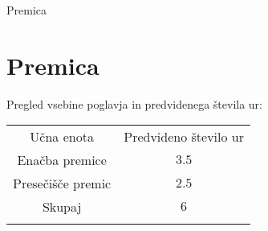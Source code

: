 \begin{priprava}{0}{}{}{Premica}{}{}
    
    \chapter{Premica}

    \Large{Pregled vsebine poglavja in predvidenega števila ur:}

    \begin{table}[H]
        \centering
        \begin{tabular}{||c|c||} 
        \hhline{|t:==:t|}
        \rowcolor[rgb]{0.843,0.718,0.718} 
        Učna enota  & Predvideno število ur   \\ 
        \hhline{|:==:|}
        Enačba premice & $3.5$    \\ 
        \hline
        Presečišče premic & $2.5$    \\ 
        \hhline{|:==:|}
        Skupaj & $6$     \\
        \hhline{|b:==:b|}
        \end{tabular}
    \end{table}


    
\end{priprava}